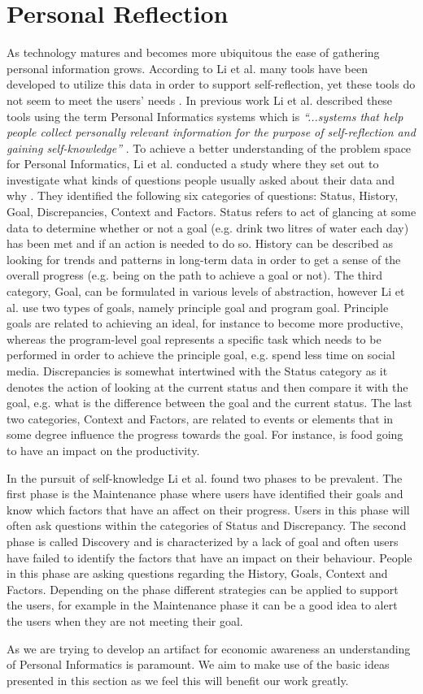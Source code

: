 \section{Personal Reflection}
As technology matures and becomes more ubiquitous the ease of gathering personal information grows. According to Li et al. many tools have been developed to utilize this data in order to support self-reflection, yet these tools do not seem to meet the users’ needs \cite{li2011understanding}. In previous work Li et al. described these tools using the term Personal Informatics systems which is \emph{“...systems that help people collect personally relevant information for the purpose of self-reflection and gaining self-knowledge”} \cite[p.~558]{li2010stage}. To achieve a better understanding of the problem space for Personal Informatics, Li et al. conducted a study where they set out to investigate what kinds of questions people usually asked about their data and why \cite{li2011understanding}. They identified the following six categories of questions: Status, History, Goal, Discrepancies, Context and Factors. Status refers to act of glancing at some data to determine whether or not a goal (e.g. drink two litres of water each day) has been met and if an action is needed to do so. History can be described as looking for trends and patterns in long-term data in order to get a sense of the overall progress (e.g. being on the path to achieve a goal or not). The third category, Goal, can be formulated in various levels of abstraction, however Li et al. use two types of goals, namely principle goal and program goal. Principle goals are related to achieving an ideal, for instance to become more productive, whereas the program-level goal represents a specific task which needs to be performed in order to achieve the principle goal, e.g. spend less time on social media. Discrepancies is somewhat intertwined with the Status category as it denotes the action of looking at the current status and then compare it with the goal, e.g. what is the difference between the goal and the current status. The last two categories, Context and Factors, are related to events or elements that in some degree influence the progress towards the goal. For instance, is food going to have an impact on the productivity.

In the pursuit of self-knowledge Li et al. found two phases to be prevalent. The first phase is the Maintenance phase where users have identified their goals and know which factors that have an affect on their progress. Users in this phase will often ask questions within the categories of Status and Discrepancy. The second phase is called Discovery and is characterized by a lack of goal and often users have failed to identify the factors that have an impact on their behaviour. People in this phase are asking questions regarding the History, Goals, Context and Factors. Depending on the phase different strategies can be applied to support the users, for example in the Maintenance phase it can be a good idea to alert the users when they are not meeting their goal.

As we are trying to develop an artifact for economic awareness an understanding of Personal Informatics is paramount. We aim to make use of the basic ideas presented in this section as we feel this will benefit our work greatly.
